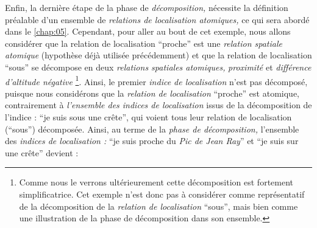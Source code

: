 Enfin, la dernière étape de la phase de \emph{décomposition,}
nécessite la définition préalable d'un ensemble de \emph{relations de
  localisation atomiques,} ce qui sera abordé dans le
\autoref{chap:05}. Cependant, pour aller au bout de cet exemple, nous
allons considérer que la relation de localisation \enquote{proche} est
une \emph{relation spatiale atomique} (hypothèse déjà utilisée
précédemment) et que la relation de localisation \enquote{sous} se
décompose en deux \emph{relations spatiales atomiques,}
\emph{proximité} et \emph{différence d'altitude négative}
\footnote{Comme nous le verrons ultérieurement cette décomposition est
  fortement simplificatrice. Cet exemple n'est donc pas à considérer
  comme représentatif de la décomposition de la \emph{relation de
    localisation} \enquote{sous}, mais bien comme une illustration de
  la phase de décomposition dans son ensemble.}. Ainsi, le premier
\emph{indice de localisation} n'est pas décomposé, puisque nous
considérons que la \emph{relation de localisation} \enquote{proche}
est atomique, contrairement à \emph{l'ensemble des indices de
  localisation} issus de la décomposition de l'indice : \enquote{je
  suis sous une crête}, qui voient tous leur relation de localisation
(\enquote{sous}) décomposée. Ainsi, au terme de la \emph{phase de
  décomposition,} l'ensemble des \emph{indices de localisation :}
\enquote{je suis proche du \emph{Pic de Jean Ray}} et \enquote{je suis
  sur une crête} devient :


